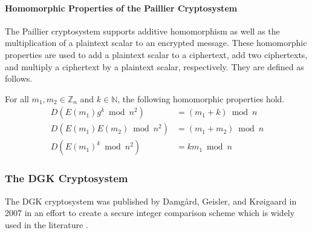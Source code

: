 
\paragraph{Homomorphic Properties of the Paillier Cryptosystem}
The Paillier cryptosystem supports additive homomorphism as well as the multiplication of a plaintext scalar to an encrypted message. These homomorphic properties are used to add a plaintext scalar to a ciphertext, add two ciphertexts, and multiply a ciphertext by a plaintext scalar, respectively. They are defined as follows.

For all $m_1,m_2 \in \mathbb{Z}_n$ and $k\in \mathbb{N}$, the following homomorphic properties hold.
\begin{align*}
  D(E(m_1)g^k\bmod n^2) &=(m_1+k)\bmod n\\
  D(E(m_1)E(m_2)\bmod n^2) &=(m_1+m_2)\bmod n\\
  D(E(m_1)^k\bmod n^2) &= km_1\bmod n
\end{align*}

\subsubsection{The DGK Cryptosystem}
The DGK cryptosystem was published by Damg{\aa}rd, Geisler, and Kr{\o}igaard in 2007 in an effort to create a secure integer comparison scheme \cite{pieprzyk_efficient_2007, cryptoeprint:2008:321} which is widely used in the literature \cite{veugen_improving_2012}.



